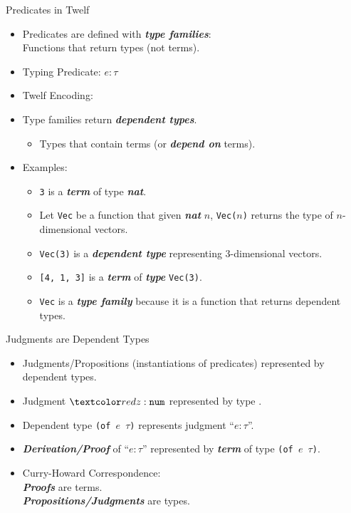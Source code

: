 \documentclass{beamer}
\renewcommand{\emph}[1]{\textbf{\textit{#1}}}
\begin{document}
\begin{frame}{Predicates in Twelf}
\begin{itemize}
\item Predicates are defined with \emph{type families}: \\
Functions that return types (not terms).

\item Typing Predicate:  $e : \tau$

\item Twelf Encoding:

\pause
\item Type families return \emph{dependent types}.
	\begin{itemize}
	\item Types that contain terms (or \emph{depend on} terms).
	\end{itemize}

\pause
\item Examples:
  \begin{itemize}
  \item \texttt{3} is a \emph{term} of type \emph{nat}.
\pause
  \item Let \texttt{Vec} be a function that given \emph{nat} $n$,
  \texttt{Vec($n$)} returns the type of $n$-dimensional vectors.
\pause
  \item \texttt{Vec(3)} is a \emph{dependent type} representing
  3-dimensional vectors.
\pause
  \item \texttt{[4, 1, 3]} is a \emph{term} of \emph{type} \texttt{Vec(3)}.
\pause
  \item \texttt{Vec} is a \emph{type family} because it is a
  function that returns dependent types.
  \end{itemize}
\end{itemize}
\end{frame}


\begin{frame}{Judgments are Dependent Types}
\begin{itemize}

\item Judgments/Propositions (instantiations of predicates) represented
by dependent types.

\item Judgment $\cemph{z : \texttt{num}}$ represented by type
\texttt{}.

\item Dependent type \texttt{(of $e$ $\tau$)} represents
judgment ``$e : \tau$''.

\pause
\item \emph{Derivation/Proof} of ``$e : \tau$'' represented
by \emph{term} of type \texttt{(of $e$ $\tau$)}.

\pause
\item Curry-Howard Correspondence: \\
\emph{Proofs} are terms. \\
\emph{Propositions/Judgments} are types.

\end{itemize}
\end{frame}
\end{document}

